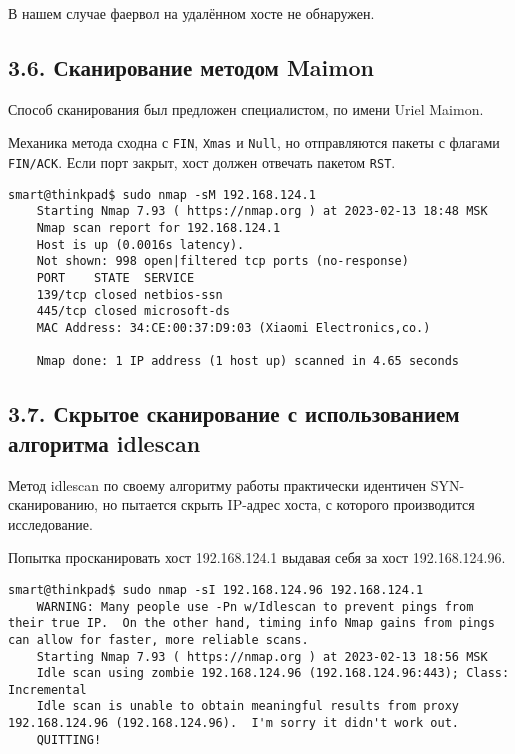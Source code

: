 В нашем случае фаервол на удалённом хосте не обнаружен.

\subsection*{3.6. Сканирование методом Maimon}

Способ сканирования был предложен специалистом, по имени Uriel Maimon.

Механика метода сходна с \texttt{FIN}, \texttt{Xmas} и \texttt{Null}, но отправляются пакеты с флагами \texttt{FIN/ACK}. Если порт закрыт, хост должен отвечать пакетом \texttt{RST}.

\begin{Verbatim}[frame=single]
    smart@thinkpad$ sudo nmap -sM 192.168.124.1
    Starting Nmap 7.93 ( https://nmap.org ) at 2023-02-13 18:48 MSK
    Nmap scan report for 192.168.124.1
    Host is up (0.0016s latency).
    Not shown: 998 open|filtered tcp ports (no-response)
    PORT    STATE  SERVICE
    139/tcp closed netbios-ssn
    445/tcp closed microsoft-ds
    MAC Address: 34:CE:00:37:D9:03 (Xiaomi Electronics,co.)

    Nmap done: 1 IP address (1 host up) scanned in 4.65 seconds
\end{Verbatim}

\subsection*{3.7. Скрытое сканирование с использованием алгоритма idlescan}

Метод idlescan по своему алгоритму работы практически идентичен SYN-сканированию, но пытается скрыть IP-адрес хоста, с которого производится исследование.

Попытка просканировать хост 192.168.124.1 выдавая себя за хост 192.168.124.96.
\begin{Verbatim}[frame=single]
    smart@thinkpad$ sudo nmap -sI 192.168.124.96 192.168.124.1
    WARNING: Many people use -Pn w/Idlescan to prevent pings from their true IP.  On the other hand, timing info Nmap gains from pings can allow for faster, more reliable scans.
    Starting Nmap 7.93 ( https://nmap.org ) at 2023-02-13 18:56 MSK
    Idle scan using zombie 192.168.124.96 (192.168.124.96:443); Class: Incremental
    Idle scan is unable to obtain meaningful results from proxy 192.168.124.96 (192.168.124.96).  I'm sorry it didn't work out.
    QUITTING!
\end{Verbatim}

